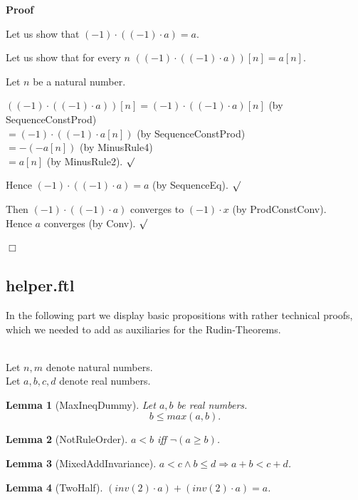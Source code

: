 \documentclass{article}
\newenvironment{forthel}{\begin{leftbar}}{\end{leftbar}}
\newenvironment{proof}{\noindent\textbf{Proof\ }}{\hspace*{\fill}$\Box$\medskip}
\newenvironment{subproof}{\begin{list}{}{}
		\item[\text{Proof}]}{\hfill $\surd$ \end{list}}
\newtheorem{lemma}{Lemma}
\newcommand{\cdottwo}{\cdot}
\newcommand{\dotequal}{=}
\begin{document}
\begin{forthel}
\begin{proof}
\begin{subproof}
			Let us show that $(-1) \cdottwo ((-1) \cdottwo a) = a$.
			\begin{subproof}
				Let us show that for every $n$ $((-1) \cdottwo ((-1) \cdottwo a))[n] = a[n]$.
				\begin{subproof}
					Let $n$ be a natural number.
					
					$((-1) \cdottwo ((-1) \cdottwo a))[n] \dotequal (-1) \cdot ((-1) \cdottwo a)[n]$ (by SequenceConstProd)\\
					$\dotequal (-1) \cdot ((-1) \cdot a[n])$ (by SequenceConstProd)\\
					$\dotequal -(-a[n])$ (by MinusRule4)\\
					$\dotequal a[n]$ (by MinusRule2).
				\end{subproof}
				
				Hence $(-1) \cdottwo ((-1) \cdottwo a) = a$ (by SequenceEq).
			\end{subproof}
			
			Then $(-1) \cdottwo ((-1) \cdottwo a)$ converges to $(-1) \cdot x$ (by ProdConstConv).\\
			Hence $a$ converges (by Conv).
		\end{subproof}
	\end{proof}
\end{forthel}

\subsection{helper.ftl}
In the following part we display basic propositions with rather technical proofs, which we needed to add as auxiliaries for the Rudin-Theorems.

\begin{forthel}
	\\
	Let $n,m$ denote natural numbers.\\
	Let $a,b,c,d$ denote real numbers.
	
	
	
	\begin{lemma}[MaxIneqDummy]
	Let $a,b$ be real numbers. $$b \leq max(a,b).$$
	\end{lemma}
	
	\begin{lemma}[NotRuleOrder]
	$a < b$ iff $\neg(a \geq b)$.
	\end{lemma}
	
	\begin{lemma}[MixedAddInvariance]
	$a < c \wedge b \leq d \Rightarrow a + b < c + d$.
	\end{lemma}
	
	\begin{lemma}[TwoHalf]
	$(inv(2) \cdot a) + (inv(2) \cdot a) = a$.
	\end{lemma}
	
\end{forthel}
\end{document}
